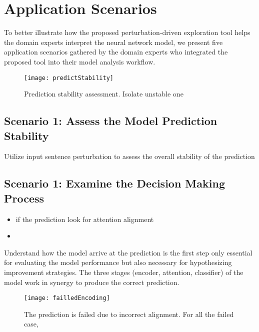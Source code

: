\section{Application Scenarios}
\label{sec:caseStudy}
To better illustrate how the proposed perturbation-driven exploration tool helps the domain experts interpret the neural network model, we present five application scenarios gathered by the domain experts who integrated the proposed tool into their model analysis workflow.

\begin{figure}[htbp]
\centering
\vspace{-2mm}
 \texttt{[image: predictStability]}
 \caption{
Prediction stability assessment. Isolate unstable one
 }
\label{fig:predictStability}
\end{figure}

\subsection{Scenario 1: Assess the Model Prediction Stability}
Utilize input sentence perturbation to assess the overall stability of the prediction


\subsection{Scenario 1: Examine the Decision Making Process}
\begin{itemize}
\item if the prediction look for attention alignment
\item 
\end{itemize}

Understand how the model arrive at the prediction is the first step  only essential for evaluating the model performance but also necessary for hypothesizing improvement strategies.
%
The three stages (encoder, attention, classifier) of the model work in synergy to produce the correct prediction.

\begin{figure*}[t]
\centering
\vspace{-2mm}
 \texttt{[image: failledEncoding]}
 \caption{
The prediction is failed due to incorrect alignment. For all the failed case, 
 }
\label{fig:failedEncoding}
\end{figure*}


